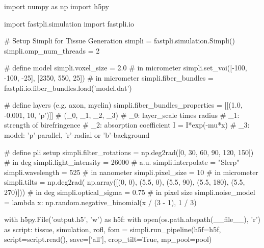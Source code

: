 import numpy as np
import h5py

import fastpli.simulation
import fastpli.io

# Setup Simpli for Tissue Generation
simpli = fastpli.simulation.Simpli()
simpli.omp_num_threads = 2

# define model
simpli.voxel_size = 2.0  # in micrometer
simpli.set_voi([-100, -100, -25], [2350, 550, 25])  # in micrometer
simpli.fiber_bundles = fastpli.io.fiber_bundles.load('model.dat')

# define layers (e.g. axon, myelin)
simpli.fiber_bundles_properties = [[(1.0, -0.001, 10, 'p')]]
# (_0, _1, _2, _3)
# _0: layer_scale times radius
# _1: strength of birefringence
# _2: absorption coefficient I = I*exp(-mu*x)
# _3: model: 'p'-parallel, 'r'-radial or 'b'-background

# define pli setup
simpli.filter_rotations = np.deg2rad([0, 30, 60, 90, 120, 150])  # in deg
simpli.light_intensity = 26000  # a.u.
simpli.interpolate = "Slerp"
simpli.wavelength = 525  # in nanometer
simpli.pixel_size = 10  # in micrometer
simpli.tilts = np.deg2rad(
    np.array([(0, 0), (5.5, 0), (5.5, 90),
              (5.5, 180), (5.5, 270)]))  # in deg
simpli.optical_sigma = 0.75  # in pixel size
simpli.noise_model =
    lambda x: np.random.negative_binomial(x / (3 - 1), 1 / 3)

with h5py.File('output.h5', 'w') as h5f:
    with open(os.path.abspath(__file__), 'r') as script:
        tissue, simulation, rofl, fom = simpli.run_pipeline(h5f=h5f,
                                               script=script.read(),
                                               save=['all'],
                                               crop_tilt=True,
                                               mp_pool=pool)

